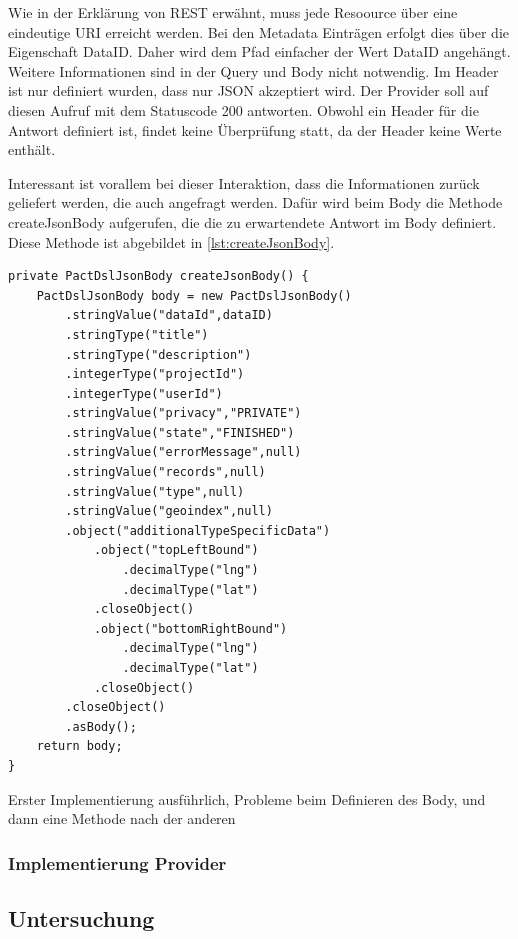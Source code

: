 \documentclass{llncs}
\begin{document}
Wie in der Erklärung von REST erwähnt, muss jede Resoource über eine eindeutige URI erreicht werden. Bei den Metadata Einträgen erfolgt dies über die Eigenschaft DataID. Daher wird dem Pfad einfacher der Wert DataID angehängt. Weitere Informationen sind in der Query und Body nicht notwendig. Im Header ist nur definiert wurden, dass nur JSON akzeptiert wird.
Der Provider soll auf diesen Aufruf mit dem Statuscode 200 antworten. Obwohl ein Header für die Antwort definiert ist, findet keine Überprüfung statt, da der Header keine Werte enthält. 

Interessant ist vorallem bei dieser Interaktion, dass die Informationen zurück geliefert werden, die auch angefragt werden. Dafür wird beim Body die Methode createJsonBody aufgerufen, die die zu erwartendete Antwort im Body definiert. Diese Methode ist abgebildet in \ref{lst:createJsonBody}.

\lstset{language = Java}
\begin{lstlisting}[caption=Test,label={lst:createJsonBody}]
private PactDslJsonBody createJsonBody() {
    PactDslJsonBody body = new PactDslJsonBody()
        .stringValue("dataId",dataID)
        .stringType("title")
        .stringType("description")
        .integerType("projectId")
        .integerType("userId")
        .stringValue("privacy","PRIVATE")
        .stringValue("state","FINISHED")
        .stringValue("errorMessage",null)
        .stringValue("records",null)
        .stringValue("type",null)
        .stringValue("geoindex",null)
        .object("additionalTypeSpecificData")
            .object("topLeftBound")
                .decimalType("lng")
                .decimalType("lat")
            .closeObject()
            .object("bottomRightBound")
                .decimalType("lng")
                .decimalType("lat")
            .closeObject()
        .closeObject()
        .asBody();
    return body;
}
\end{lstlisting}

Erster Implementierung ausführlich, Probleme beim Definieren des Body, und dann eine Methode nach der anderen

\subsubsection{Implementierung Provider}

\subsection{Untersuchung}
\end{document}
